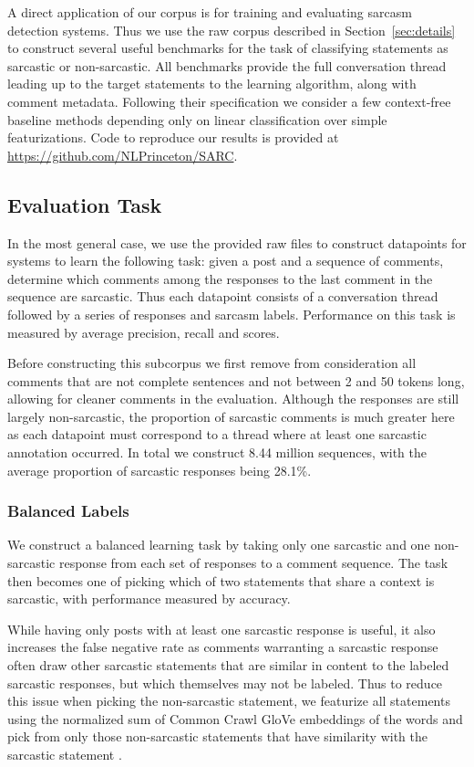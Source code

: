\documentclass[10pt, a4paper]{article}
\begin{document}
A direct application of our corpus is for training and evaluating sarcasm detection systems.
Thus we use the raw corpus described in Section~\ref{sec:details} to construct several useful benchmarks for the task of classifying statements as sarcastic or non-sarcastic.
All benchmarks provide the full conversation thread leading up to the target statements to the learning algorithm, along with comment metadata.
Following their specification we consider a few context-free baseline methods depending only on linear classification over simple featurizations.
Code to reproduce our results is provided at \url{https://github.com/NLPrinceton/SARC}.

\subsection{Evaluation Task}
\label{subsec:task}

In the most general case, we use the provided raw files to construct datapoints for systems to learn the following task: given a post and a sequence of comments, determine which comments among the responses to the last comment in the sequence are sarcastic.
Thus each datapoint consists of a conversation thread followed by a series of responses and sarcasm labels.
Performance on this task is measured by average precision, recall and  scores.

Before constructing this subcorpus we first remove from consideration all comments that are not complete sentences and not between 2 and 50 tokens long, allowing for cleaner comments in the evaluation. 
Although the responses are still largely non-sarcastic, the proportion of sarcastic comments is much greater here as each datapoint must correspond to a thread where at least one sarcastic annotation occurred.
In total we construct 8.44 million sequences, with the average proportion of sarcastic responses being 28.1\%.

\subsubsection{Balanced Labels}
We construct a balanced learning task by taking only one sarcastic and one non-sarcastic response from each set of responses to a comment sequence.
The task then becomes one of picking which of two statements that share a context is sarcastic, with performance measured by accuracy.

While having only posts with at least one sarcastic response is useful, it also increases the false negative rate as comments warranting a sarcastic response often draw other sarcastic statements that are similar in content to the labeled sarcastic responses, but which themselves may not be labeled.
Thus to reduce this issue when picking the non-sarcastic statement, we featurize all statements using the normalized sum of Common Crawl GloVe embeddings of the words and pick from only those non-sarcastic statements that have similarity  with the sarcastic statement \cite{Pennington:14}. 
\end{document}
